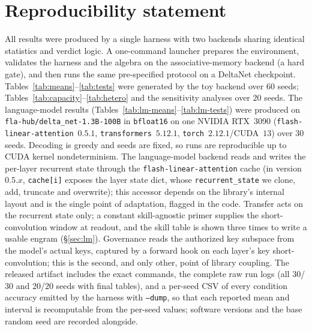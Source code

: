 \documentclass[11pt]{article}
\theoremstyle{definition}
\begin{document}
\section*{Reproducibility statement}

All results were produced by a single harness with two backends sharing identical statistics and verdict logic. A one-command launcher prepares the environment, validates the harness and the algebra on the associative-memory backend (a hard gate), and then runs the same pre-specified protocol on a DeltaNet checkpoint. Tables~\ref{tab:means}--\ref{tab:tests} were generated by the toy backend over $60$ seeds; Tables~\ref{tab:capacity}--\ref{tab:hetero} and the sensitivity analyses over $20$ seeds. The language-model results (Tables~\ref{tab:lm-means}--\ref{tab:lm-tests}) were produced on \texttt{fla-hub/delta\_net-1.3B-100B} in \texttt{bfloat16} on one NVIDIA RTX~3090 (\texttt{flash-linear-attention}~$0.5.1$, \texttt{transformers}~$5.12.1$, \texttt{torch}~$2.12.1$/CUDA~$13$) over $30$ seeds. Decoding is greedy and seeds are fixed, so runs are reproducible up to CUDA kernel nondeterminism. The language-model backend reads and writes the per-layer recurrent state through the \texttt{flash-linear-attention} cache (in version~$0.5.x$, \texttt{cache[i]} exposes the layer state dict, whose \texttt{recurrent\_state} we clone, add, truncate and overwrite); this accessor depends on the library's internal layout and is the single point of adaptation, flagged in the code. Transfer acts on the recurrent state only; a constant skill-agnostic primer supplies the short-convolution window at readout, and the skill table is shown three times to write a usable engram (\S\ref{sec:lm}). Governance reads the authorized key subspace from the model's actual keys, captured by a forward hook on each layer's key short-convolution; this is the second, and only other, point of library coupling. The released artifact includes the exact commands, the complete raw run logs (all $30$/$30$ and $20$/$20$ seeds with final tables), and a per-seed CSV of every condition accuracy emitted by the harness with \texttt{--dump}, so that each reported mean and interval is recomputable from the per-seed values; software versions and the base random seed are recorded alongside.
\end{document}
